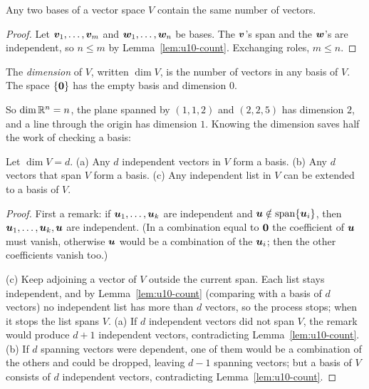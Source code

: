\begin{theorem}\label{thm:u10-dim}
Any two bases of a vector space $V$ contain the same number of vectors.
\end{theorem}
\begin{proof}
Let $\boldsymbol{v}_1,\dots,\boldsymbol{v}_m$ and $\boldsymbol{w}_1,\dots,\boldsymbol{w}_n$ be bases. The $\boldsymbol{v}$'s span and the
$\boldsymbol{w}$'s are independent, so $n\le m$ by Lemma~\ref{lem:u10-count}. Exchanging roles,
$m\le n$.
\end{proof}

\begin{definition}[Dimension]\label{def:u10-dim}
The \emph{dimension} of $V$, written $\dim V$, is the number of vectors in any basis of $V$. The
space $\{\boldsymbol{0}\}$ has the empty basis and dimension $0$.
\end{definition}

So $\dim\mathbb{R}^n=n$, the plane spanned by $(1,1,2)$ and $(2,2,5)$ has dimension $2$, and a line through
the origin has dimension $1$. Knowing the dimension saves half the work of checking a basis:

\begin{proposition}\label{prop:u10-right}
Let $\dim V=d$. (a) Any $d$ independent vectors in $V$ form a basis. (b) Any $d$ vectors that span
$V$ form a basis. (c) Any independent list in $V$ can be extended to a basis of $V$.
\end{proposition}
\begin{proof}
First a remark: if $\boldsymbol{u}_1,\dots,\boldsymbol{u}_k$ are independent and $\boldsymbol{u}\notin\operatorname{span}\{\boldsymbol{u}_i\}$,
then $\boldsymbol{u}_1,\dots,\boldsymbol{u}_k,\boldsymbol{u}$ are independent. (In a combination equal to $\boldsymbol{0}$ the
coefficient of $\boldsymbol{u}$ must vanish, otherwise $\boldsymbol{u}$ would be a combination of the $\boldsymbol{u}_i$;
then the other coefficients vanish too.)

(c) Keep adjoining a vector of $V$ outside the current span. Each list stays independent, and by
Lemma~\ref{lem:u10-count} (comparing with a basis of $d$ vectors) no independent list has more than
$d$ vectors, so the process stops; when it stops the list spans $V$.
(a) If $d$ independent vectors did not span $V$, the remark would produce $d+1$ independent vectors,
contradicting Lemma~\ref{lem:u10-count}.
(b) If $d$ spanning vectors were dependent, one of them would be a combination of the others and
could be dropped, leaving $d-1$ spanning vectors; but a basis of $V$ consists of $d$ independent
vectors, contradicting Lemma~\ref{lem:u10-count}.
\end{proof}

